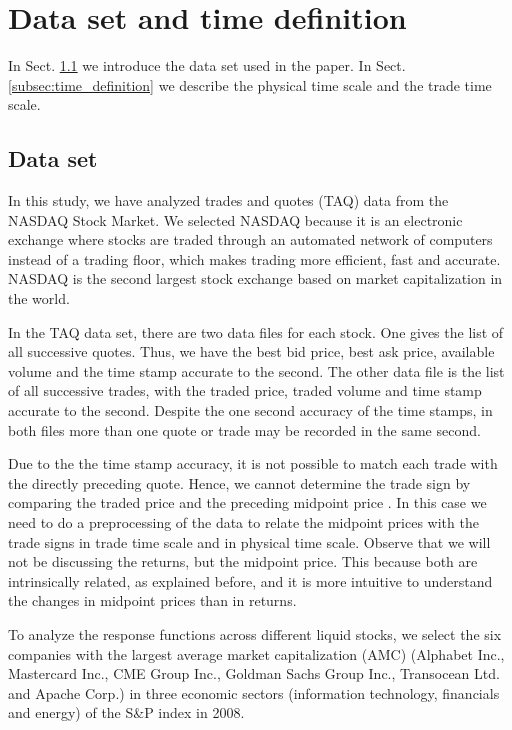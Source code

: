 \section{Data set and time definition}\label{sec:data_time}

In Sect. \ref{subsec:data_set} we introduce the data set used in the paper. In
Sect. \ref{subsec:time_definition} we describe the physical time scale and the
trade time scale.

\subsection{Data set}\label{subsec:data_set}

In this study, we have analyzed trades and quotes (TAQ) data from the NASDAQ
Stock Market. We selected NASDAQ because it is an electronic exchange where
stocks are traded through an automated network of computers instead of a
trading floor, which makes trading more efficient, fast and accurate.
NASDAQ is the second largest stock exchange based on market capitalization in
the world.

In the TAQ data set, there are two data files for each stock. One gives the
list of all successive quotes. Thus, we have the best bid price, best ask
price, available volume and the time stamp accurate to the second. The other
data file is the list of all successive trades, with the traded price, traded
volume and time stamp accurate to the second. Despite the one second accuracy
of the time stamps, in both files more than one quote or trade may be recorded
in the same second.

Due to the the time stamp accuracy, it is not possible to match each trade with
the directly preceding quote. Hence, we cannot determine the trade sign by
comparing the traded price and the preceding midpoint price
\cite{Wang_2016_cross}. In this case we need to do a preprocessing of the data
to relate the midpoint prices with the trade signs in trade time scale and in
physical time scale. Observe that we will not be discussing the returns, but
the midpoint price. This because both are intrinsically related, as explained
before, and it is more intuitive to understand the changes in midpoint prices
than in returns.

To analyze the response functions across different liquid stocks, we select the
six companies with the largest average market capitalization (AMC) (Alphabet
Inc., Mastercard Inc., CME Group Inc., Goldman Sachs Group Inc., Transocean
Ltd. and Apache Corp.) in three economic sectors (information technology,
financials and energy) of the S\&P index in 2008.


